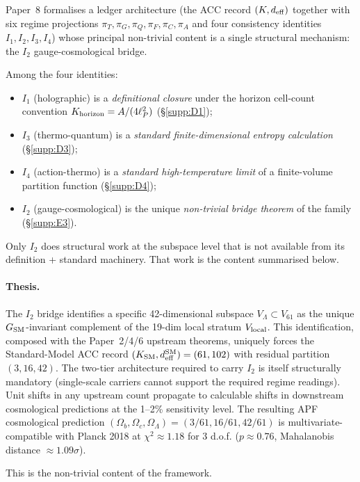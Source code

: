 \documentclass[11pt]{article}
\theoremstyle{plain}
\theoremstyle{definition}
\theoremstyle{remark}
\begin{document}
Paper~8 formalises a ledger architecture (the ACC record $(K, d_{\rm eff})$ together with six regime projections $\pi_T, \pi_G, \pi_Q, \pi_F, \pi_C, \pi_A$ and four consistency identities $I_1, I_2, I_3, I_4$) whose principal non-trivial content is a single structural mechanism: the $I_2$ gauge-cosmological bridge.

Among the four identities:
\begin{itemize}[leftmargin=2em,itemsep=2pt]
  \item $I_1$ (holographic) is a \emph{definitional closure} under the horizon cell-count convention $K_{\rm horizon} = A/(4\ell_P^2)$ (\S\ref{supp:D1});
  \item $I_3$ (thermo-quantum) is a \emph{standard finite-dimensional entropy calculation} (\S\ref{supp:D3});
  \item $I_4$ (action-thermo) is a \emph{standard high-temperature limit} of a finite-volume partition function (\S\ref{supp:D4});
  \item $I_2$ (gauge-cosmological) is the unique \emph{non-trivial bridge theorem} of the family (\S\ref{supp:E3}).
\end{itemize}
Only $I_2$ does structural work at the subspace level that is not available from its definition + standard machinery.  That work is the content summarised below.

\paragraph{Thesis.}  The $I_2$ bridge identifies a specific 42-dimensional subspace $V_\Lambda \subset V_{61}$ as the unique $G_{\rm SM}$-invariant complement of the 19-dim local stratum $V_{\rm local}$.  This identification, composed with the Paper~2/4/6 upstream theorems, uniquely forces the Standard-Model ACC record $(K_{\rm SM}, d_{\rm eff}^{\rm SM}) = (61, 102)$ with residual partition $(3, 16, 42)$.  The two-tier architecture required to carry $I_2$ is itself structurally mandatory (single-scale carriers cannot support the required regime readings).  Unit shifts in any upstream count propagate to calculable shifts in downstream cosmological predictions at the 1--2\% sensitivity level.  The resulting APF cosmological prediction $(\Omega_b, \Omega_c, \Omega_\Lambda) = (3/61, 16/61, 42/61)$ is multivariate-compatible with Planck 2018 at $\chi^2 \approx 1.18$ for 3 d.o.f. ($p \approx 0.76$, Mahalanobis distance $\approx 1.09\sigma$).

This is the non-trivial content of the framework.
\end{document}
